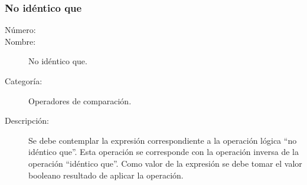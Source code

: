 \subsubsection{No idéntico que}
\begin{framed}
	\begin{description}
		\item [Número:] \cn
		\item [Nombre:] No idéntico que.
		\item [Categoría:] Operadores de comparación.
		\item [Descripción:] Se debe contemplar la expresión correspondiente a la operación lógica ``no idéntico que''. Esta operación
		se corresponde con la operación inversa de la operación ``idéntico que''. Como valor
		de la expresión se debe tomar el valor booleano resultado de aplicar la operación.
	\end {description}
\end{framed}
